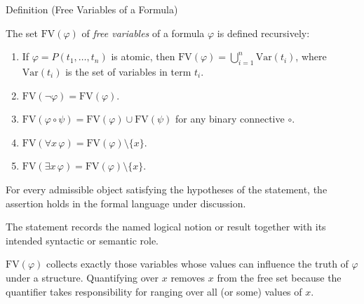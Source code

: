 \begin{definitionbox}{Definition (Free Variables of a Formula)}
\begin{definition}\label{def:fv}
The set $\mathrm{FV}(\varphi)$ of \emph{free variables} of a formula $\varphi$
is defined recursively:
\begin{enumerate}
  \item If $\varphi = P(t_1,\dots,t_n)$ is atomic, then
  $\mathrm{FV}(\varphi) = \bigcup_{i=1}^n \mathrm{Var}(t_i)$,
  where $\mathrm{Var}(t_i)$ is the set of variables in term $t_i$.

  \item $\mathrm{FV}(\neg \varphi) = \mathrm{FV}(\varphi)$.

  \item $\mathrm{FV}(\varphi \circ \psi) = \mathrm{FV}(\varphi) \cup \mathrm{FV}(\psi)$
  for any binary connective $\circ$.

  \item $\mathrm{FV}(\forall x\,\varphi) = \mathrm{FV}(\varphi) \setminus \{x\}$.

  \item $\mathrm{FV}(\exists x\,\varphi) = \mathrm{FV}(\varphi) \setminus \{x\}$.
\end{enumerate}
\end{definition}
\end{definitionbox}
\begin{remark*}
For every admissible object satisfying the hypotheses of the statement, the
assertion holds in the formal language under discussion.
\end{remark*}

\begin{remark*}[Interpretation]
The statement records the named logical notion or result together with its
intended syntactic or semantic role.
\end{remark*}


\begin{remark*}[Exposition]
$\mathrm{FV}(\varphi)$ collects exactly those variables whose values can
influence the truth of $\varphi$ under a structure. Quantifying over $x$
removes $x$ from the free set because the quantifier takes responsibility for
ranging over all (or some) values of $x$.
\end{remark*}


